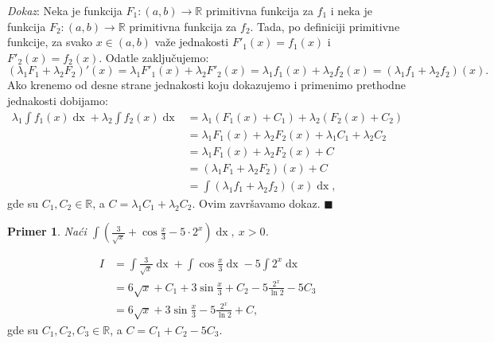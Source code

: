 \documentclass{article}
\newtheorem{prim}{Primer}[section]
\DeclareMathOperator{\dx}{dx}
\begin{document}
\textit{Dokaz}: Neka je funkcija $F_1: \left(a, b\right) \longrightarrow \mathbb{R}$
primitivna funkcija za $f_1$ i neka je funkcija $F_2: \left(a, b\right)
    \longrightarrow \mathbb{R}$ primitivna funkcija za $f_2$.
Tada, po definiciji primitivne funkcije, za svako $x\in\left(a,b\right)$ važe jednakosti
$F'_1\left(x\right) = f_1\left(x\right)$ i $F'_2\left(x\right) = f_2\left(x\right)$.
Odatle zaključujemo:
$$\left(\lambda_1 F_1 + \lambda_2 F_2\right)'\left(x\right) =
    \lambda_1 F'_1\left(x\right) + \lambda_2 F'_2\left(x\right) =
    \lambda_1 f_1\left(x\right) + \lambda_2 f_2\left(x\right) =
    \left(\lambda_1 f_1 + \lambda_2 f_2\right)\left(x\right).$$
Ako krenemo od desne strane jednakosti koju dokazujemo i
primenimo prethodne jednakosti dobijamo:
\begin{align*}
    \lambda_1\int f_1\left(x\right) \dx + \lambda_2\int f_2\left(x\right) \dx & =\lambda_1\left(F_1\left(x\right) + C_1\right) + \lambda_2\left(F_2\left(x\right) + C_2\right) \\
                                                                              & =\lambda_1  F_1\left(x\right) + \lambda_2  F_2\left(x\right) + \lambda_1  C_1 + \lambda_2  C_2 \\
                                                                              & =\lambda_1  F_1\left(x\right) + \lambda_2  F_2\left(x\right) + C                               \\
                                                                              & =\left(\lambda_1 F_1 + \lambda_2 F_2\right)\left(x\right) + C                                  \\
                                                                              & =\int \left(\lambda_1 f_1+ \lambda_2 f_2\right)\left(x\right)\dx,
\end{align*}
gde su $C_1,C_2\in\mathbb{R}$, a $C=\lambda_1C_1+\lambda_2C_2$. Ovim završavamo dokaz.
\null\hfill $\blacksquare$\par

\begin{primbox}
    \label{primer_1.6}
    \begin{prim}
        Naći $\displaystyle\int \left(\frac{3}{\sqrt{x}} +
            \cos\frac{x}{3} - 5\cdot 2^x\right)\dx,\ x > 0$.
    \end{prim}
    \begin{align*}
        I & = \int\frac{3}{\sqrt{x}} \dx + \int \cos\frac{x}{3} \dx - 5\int 2^x \dx
        \\ & = 6\sqrt{x} + C_1 + 3\sin\frac{x}{3} + C_2 - 5\frac{2^x}{\ln{2}} - 5C_3
        \\ & = 6\sqrt{x} + 3\sin\frac{x}{3} - 5\frac{2^x}{\ln{2}} + C,
    \end{align*}
    gde su $C_1,C_2,C_3\in\mathbb{R}$, a $C=C_1+C_2-5C_3$.
\end{primbox}
\end{document}
